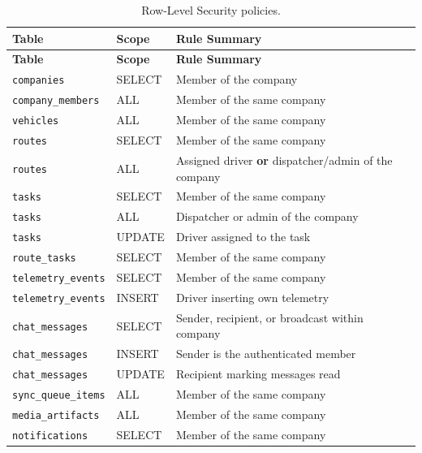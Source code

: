 \begin{small}
\begin{longtable}{@{}p{3.5cm}p{1.8cm}p{7.7cm}@{}}
\caption{Row-Level Security policies.}
\label{tab:rls-policies}\\
\toprule
\textbf{Table} & \textbf{Scope} & \textbf{Rule Summary}\\
\midrule
\endfirsthead
\toprule
\textbf{Table} & \textbf{Scope} & \textbf{Rule Summary}\\
\midrule
\endhead
\bottomrule
\endlastfoot

\texttt{companies}        & SELECT & Member of the company \\
\texttt{company\_members} & ALL    & Member of the same company \\
\texttt{vehicles}         & ALL    & Member of the same company \\
\texttt{routes}           & SELECT & Member of the same company \\
\texttt{routes}           & ALL    & Assigned driver \textbf{or} dispatcher/admin of the company \\
\texttt{tasks}            & SELECT & Member of the same company \\
\texttt{tasks}            & ALL    & Dispatcher or admin of the company \\
\texttt{tasks}            & UPDATE & Driver assigned to the task \\
\texttt{route\_tasks}     & SELECT & Member of the same company \\
\texttt{telemetry\_events}& SELECT & Member of the same company \\
\texttt{telemetry\_events}& INSERT & Driver inserting own telemetry \\
\texttt{chat\_messages}   & SELECT & Sender, recipient, or broadcast within company \\
\texttt{chat\_messages}   & INSERT & Sender is the authenticated member \\
\texttt{chat\_messages}   & UPDATE & Recipient marking messages read \\
\texttt{sync\_queue\_items} & ALL    & Member of the same company \\
\texttt{media\_artifacts}    & ALL    & Member of the same company \\
\texttt{notifications}    & SELECT & Member of the same company \\
\end{longtable}
\end{small}

